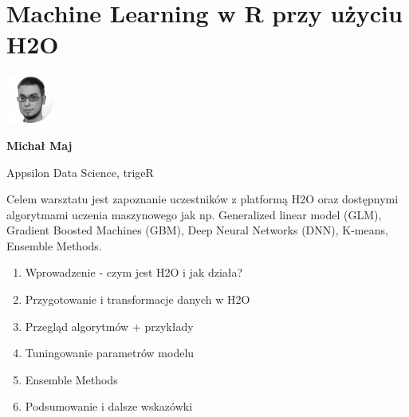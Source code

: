 \documentclass[\main/boa.tex]{subfiles}
\begin{document}
\section{Machine Learning w R przy użyciu H2O}
\begin{minipage}[t]{0.915\textwidth}
	\center     
    \includegraphics[width=60px]{img/workshops/czarno_biale/mmaj-crop.png} 
\end{minipage}

\begin{minipage}{0.915\textwidth}
\centering
{\bf {} Michał Maj}
\end{minipage}

\vskip 0.3cm

\begin{affiliations}
\begin{minipage}{0.915\textwidth}
\centering
\large Appsilon Data Science, trigeR  \\[2pt]
\end{minipage}
\end{affiliations}

\vskip 0.8cm

\opiswarsztatu Celem warsztatu jest zapoznanie uczestników z platformą H2O oraz dostępnymi algorytmami uczenia maszynowego jak np. Generalized linear model (GLM), Gradient Boosted Machines (GBM), Deep Neural Networks (DNN), K-means, Ensemble Methods.

\planwarsztatu
\begin{enumerate}
\item Wprowadzenie - czym jest H2O i jak działa?
\item Przygotowanie i transformacje danych w H2O
\item Przegląd algorytmów + przykłady
\item Tuningowanie parametrów modelu
\item Ensemble Methods
\item Podsumowanie i dalsze wskazówki
\end{enumerate}	 
\end{document}
